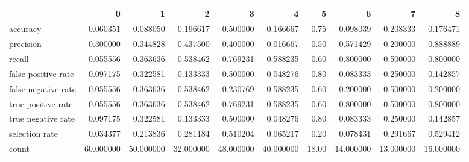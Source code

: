 \begin{tabular}{lrrrrrrrrr}
\toprule
{} &          0 &          1 &          2 &          3 &          4 &      5 &          6 &          7 &          8 \\
\midrule
accuracy            &   0.060351 &   0.088050 &   0.196617 &   0.500000 &   0.166667 &   0.75 &   0.098039 &   0.208333 &   0.176471 \\
precision           &   0.300000 &   0.344828 &   0.437500 &   0.400000 &   0.016667 &   0.50 &   0.571429 &   0.200000 &   0.888889 \\
recall              &   0.055556 &   0.363636 &   0.538462 &   0.769231 &   0.588235 &   0.60 &   0.800000 &   0.500000 &   0.800000 \\
false positive rate &   0.097175 &   0.322581 &   0.133333 &   0.500000 &   0.048276 &   0.80 &   0.083333 &   0.250000 &   0.142857 \\
false negative rate &   0.055556 &   0.363636 &   0.538462 &   0.230769 &   0.588235 &   0.60 &   0.200000 &   0.500000 &   0.200000 \\
true positive rate  &   0.055556 &   0.363636 &   0.538462 &   0.769231 &   0.588235 &   0.60 &   0.800000 &   0.500000 &   0.800000 \\
true negative rate  &   0.097175 &   0.322581 &   0.133333 &   0.500000 &   0.048276 &   0.80 &   0.083333 &   0.250000 &   0.142857 \\
selection rate      &   0.034377 &   0.213836 &   0.281184 &   0.510204 &   0.065217 &   0.20 &   0.078431 &   0.291667 &   0.529412 \\
count               &  60.000000 &  50.000000 &  32.000000 &  48.000000 &  40.000000 &  18.00 &  14.000000 &  13.000000 &  16.000000 \\
\bottomrule
\end{tabular}
